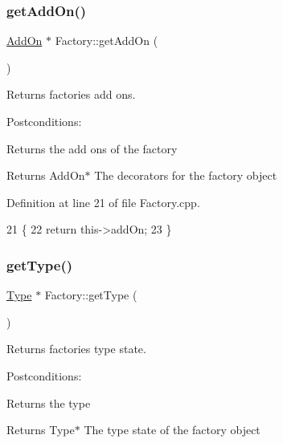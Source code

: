 \subsubsection{\texorpdfstring{get\+Add\+On()}{getAddOn()}}
{\footnotesize\ttfamily \hyperlink{classAddOn}{Add\+On} $\ast$ Factory\+::get\+Add\+On (\begin{DoxyParamCaption}{ }\end{DoxyParamCaption})}



Returns factories add ons. 

Postconditions\+:
\begin{DoxyItemize}
\item Returns the add ons of the factory
\end{DoxyItemize}

\begin{DoxyReturn}{Returns}
Add\+On$\ast$ The decorators for the factory object 
\end{DoxyReturn}


Definition at line 21 of file Factory.\+cpp.


\begin{DoxyCode}
21                          \{
22     \textcolor{keywordflow}{return} this->addOn;
23 \}
\end{DoxyCode}
\mbox{\label{classFactory_ac91051006ace7ec5bb6ecf0fe6d02d58}} 
\subsubsection{\texorpdfstring{get\+Type()}{getType()}}
{\footnotesize\ttfamily \hyperlink{classType}{Type} $\ast$ Factory\+::get\+Type (\begin{DoxyParamCaption}{ }\end{DoxyParamCaption})}



Returns factories type state. 

Postconditions\+:
\begin{DoxyItemize}
\item Returns the type
\end{DoxyItemize}

\begin{DoxyReturn}{Returns}
Type$\ast$ The type state of the factory object 
\end{DoxyReturn}


